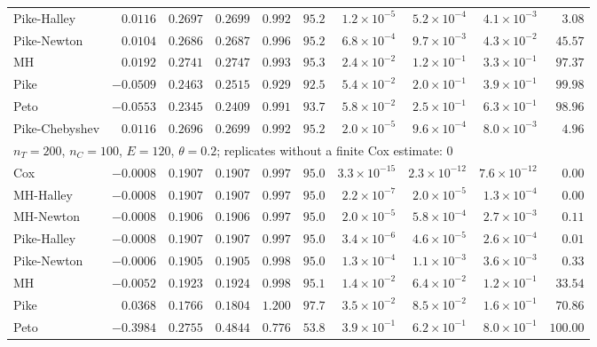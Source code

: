 \begin{landscape}
\begin{longtable}{lrrrrrrrrr}
Pike-Halley & $0.0116$ & $0.2697$ & $0.2699$ & $0.992$ & $95.2$ & $1.2 \times 10^{-5}$ & $5.2 \times 10^{-4}$ & $4.1 \times 10^{-3}$ & $3.08$ \\
Pike-Newton & $0.0104$ & $0.2686$ & $0.2687$ & $0.996$ & $95.2$ & $6.8 \times 10^{-4}$ & $9.7 \times 10^{-3}$ & $4.3 \times 10^{-2}$ & $45.57$ \\
MH & $0.0192$ & $0.2741$ & $0.2747$ & $0.993$ & $95.3$ & $2.4 \times 10^{-2}$ & $1.2 \times 10^{-1}$ & $3.3 \times 10^{-1}$ & $97.37$ \\
Pike & $-0.0509$ & $0.2463$ & $0.2515$ & $0.929$ & $92.5$ & $5.4 \times 10^{-2}$ & $2.0 \times 10^{-1}$ & $3.9 \times 10^{-1}$ & $99.98$ \\
Peto & $-0.0553$ & $0.2345$ & $0.2409$ & $0.991$ & $93.7$ & $5.8 \times 10^{-2}$ & $2.5 \times 10^{-1}$ & $6.3 \times 10^{-1}$ & $98.96$ \\
Pike-Chebyshev & $0.0116$ & $0.2696$ & $0.2699$ & $0.992$ & $95.2$ & $2.0 \times 10^{-5}$ & $9.6 \times 10^{-4}$ & $8.0 \times 10^{-3}$ & $4.96$ \\
\multicolumn{10}{l}{$n_T = 200$, $n_C = 100$, $E = 120$, $\theta = 0.2$; replicates without a finite Cox estimate: 0} \\
Cox & $-0.0008$ & $0.1907$ & $0.1907$ & $0.997$ & $95.0$ & $3.3 \times 10^{-15}$ & $2.3 \times 10^{-12}$ & $7.6 \times 10^{-12}$ & $0.00$ \\
MH-Halley & $-0.0008$ & $0.1907$ & $0.1907$ & $0.997$ & $95.0$ & $2.2 \times 10^{-7}$ & $2.0 \times 10^{-5}$ & $1.3 \times 10^{-4}$ & $0.00$ \\
MH-Newton & $-0.0008$ & $0.1906$ & $0.1906$ & $0.997$ & $95.0$ & $2.0 \times 10^{-5}$ & $5.8 \times 10^{-4}$ & $2.7 \times 10^{-3}$ & $0.11$ \\
Pike-Halley & $-0.0008$ & $0.1907$ & $0.1907$ & $0.997$ & $95.0$ & $3.4 \times 10^{-6}$ & $4.6 \times 10^{-5}$ & $2.6 \times 10^{-4}$ & $0.01$ \\
Pike-Newton & $-0.0006$ & $0.1905$ & $0.1905$ & $0.998$ & $95.0$ & $1.3 \times 10^{-4}$ & $1.1 \times 10^{-3}$ & $3.6 \times 10^{-3}$ & $0.33$ \\
MH & $-0.0052$ & $0.1923$ & $0.1924$ & $0.998$ & $95.1$ & $1.4 \times 10^{-2}$ & $6.4 \times 10^{-2}$ & $1.2 \times 10^{-1}$ & $33.54$ \\
Pike & $0.0368$ & $0.1766$ & $0.1804$ & $1.200$ & $97.7$ & $3.5 \times 10^{-2}$ & $8.5 \times 10^{-2}$ & $1.6 \times 10^{-1}$ & $70.86$ \\
Peto & $-0.3984$ & $0.2755$ & $0.4844$ & $0.776$ & $53.8$ & $3.9 \times 10^{-1}$ & $6.2 \times 10^{-1}$ & $8.0 \times 10^{-1}$ & $100.00$ \\

\end{longtable}
\end{landscape}
